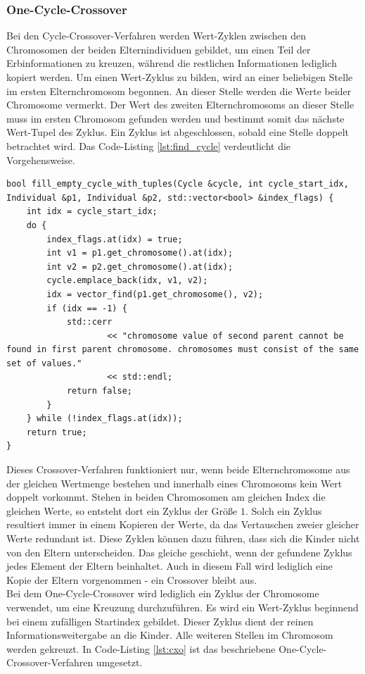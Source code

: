 \pagebreak

\subsubsection{One-Cycle-Crossover}
Bei den Cycle-Crossover-Verfahren \cite[S. 275]{schoeneburg} werden Wert-Zyklen zwischen den Chromosomen der beiden Elternindividuen gebildet, um einen Teil der Erbinformationen zu kreuzen, während die restlichen Informationen lediglich kopiert werden.
Um einen Wert-Zyklus zu bilden, wird an einer beliebigen Stelle im ersten Elternchromosom begonnen. An dieser Stelle werden die Werte beider Chromosome vermerkt. Der Wert des zweiten Elternchromosoms an dieser Stelle muss im ersten Chromosom gefunden werden und bestimmt somit das nächste Wert-Tupel des Zyklus. Ein Zyklus ist abgeschlossen, sobald eine Stelle doppelt betrachtet wird. Das Code-Listing \ref{lst:find_cycle} verdeutlicht die Vorgehensweise.

\begin{minipage}[!htb]{\linewidth}
\begin{lstlisting}[caption={Zyklus finden}, firstnumber=1, captionpos=b, label=lst:find_cycle]
bool fill_empty_cycle_with_tuples(Cycle &cycle, int cycle_start_idx, Individual &p1, Individual &p2, std::vector<bool> &index_flags) {
    int idx = cycle_start_idx;
    do {
        index_flags.at(idx) = true;
        int v1 = p1.get_chromosome().at(idx);
        int v2 = p2.get_chromosome().at(idx);
        cycle.emplace_back(idx, v1, v2);
        idx = vector_find(p1.get_chromosome(), v2);
        if (idx == -1) {
            std::cerr
                    << "chromosome value of second parent cannot be found in first parent chromosome. chromosomes must consist of the same set of values."
                    << std::endl;
            return false;
        }
    } while (!index_flags.at(idx));
    return true;
}
\end{lstlisting}
\end{minipage}

Dieses Crossover-Verfahren funktioniert nur, wenn beide Elternchromosome aus der gleichen Wertmenge bestehen und innerhalb eines Chromosoms kein Wert doppelt vorkommt.
Stehen in beiden Chromosomen am gleichen Index die gleichen Werte, so entsteht dort ein Zyklus der Größe $1$. Solch ein Zyklus resultiert immer in einem Kopieren der Werte, da das Vertauschen zweier gleicher Werte redundant ist. Diese Zyklen können dazu führen, dass sich die Kinder nicht von den Eltern unterscheiden.
Das gleiche geschieht, wenn der gefundene Zyklus jedes Element der Eltern beinhaltet. Auch in diesem Fall wird lediglich eine Kopie der Eltern vorgenommen - ein Crossover bleibt aus.\\
Bei dem One-Cycle-Crossover wird lediglich ein Zyklus der Chromosome verwendet, um eine Kreuzung durchzuführen. Es wird ein Wert-Zyklus beginnend bei einem zufälligen Startindex gebildet. Dieser Zyklus dient der reinen Informationsweitergabe an die Kinder. Alle weiteren Stellen im Chromosom werden gekreuzt.
In Code-Listing \ref{lst:cxo} ist das beschriebene One-Cycle-Crossover-Verfahren umgesetzt.

